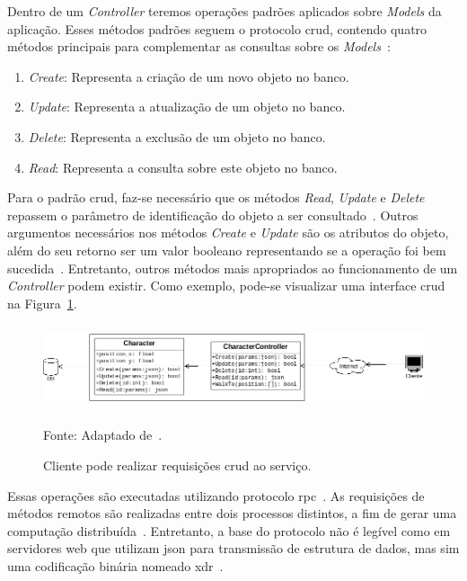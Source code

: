 Dentro de um \textit{Controller} teremos operações padrões aplicados sobre \textit{Models} da aplicação. %
%
Esses métodos padrões seguem o protocolo \ac{crud}, contendo quatro métodos principais para complementar as consultas sobre os \textit{Models}~\cite{Chadwick2012Oct, LeckyThompson2008Nov}:



\begin{enumerate}
  \item \textit{Create}: Representa a criação de um novo objeto no banco.
  \item \textit{Update}: Representa a atualização de um objeto no banco.
  \item \textit{Delete}: Representa a exclusão de um objeto no banco.
  \item \textit{Read}: Representa a consulta sobre este objeto no banco.
\end{enumerate}



Para o padrão \ac{crud}, faz-se necessário que os métodos \textit{Read}, \textit{Update} e \textit{Delete} repassem o parâmetro de identificação do objeto a ser consultado~\cite{LeckyThompson2008Nov}.
%
Outros argumentos necessários nos métodos \textit{Create} e \textit{Update} são os atributos do objeto, além do seu retorno ser um valor booleano representando se a operação foi bem sucedida~\cite{Chadwick2012Oct, LeckyThompson2008Nov}.
%
Entretanto, outros métodos mais apropriados ao funcionamento de um \textit{Controller} podem existir.
%
Como exemplo, pode-se visualizar uma interface \ac{crud} na Figura~\ref{fig:crud}.



\begin{figure}[htb!]
\caption{Cliente pode realizar requisições \ac{crud} ao serviço.}
\label{fig:crud}
\includegraphics[height=2.5cm]{img/cap2/crud.png}
\centering

Fonte: Adaptado de~\cite{albion_online_unite}.
\end{figure}



Essas operações são executadas utilizando protocolo \ac{rpc}~\cite{albion_online_unite}.
%
As requisições de métodos remotos são realizadas entre dois processos distintos, a fim de gerar uma computação distribuída~\cite{rpc}.
%
Entretanto, a base do protocolo não é legível como em servidores web que utilizam \ac{json} para transmissão de estrutura de dados, mas sim uma codificação binária nomeado \ac{xdr}~\cite{xdr}.

